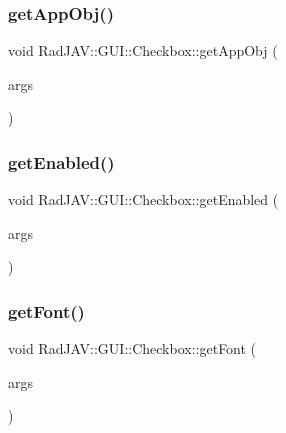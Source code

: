 \subsubsection{\texorpdfstring{get\+App\+Obj()}{getAppObj()}}
{\footnotesize\ttfamily void Rad\+J\+A\+V\+::\+G\+U\+I\+::\+Checkbox\+::get\+App\+Obj (\begin{DoxyParamCaption}\item[{const v8\+::\+Function\+Callback\+Info$<$ v8\+::\+Value $>$ \&}]{args }\end{DoxyParamCaption})\hspace{0.3cm}{\ttfamily [static]}}

\mbox{\label{class_rad_j_a_v_1_1_g_u_i_1_1_checkbox_a5dc6692db847ae14d49a7338acfaa6db}} 
\subsubsection{\texorpdfstring{get\+Enabled()}{getEnabled()}}
{\footnotesize\ttfamily void Rad\+J\+A\+V\+::\+G\+U\+I\+::\+Checkbox\+::get\+Enabled (\begin{DoxyParamCaption}\item[{const v8\+::\+Function\+Callback\+Info$<$ v8\+::\+Value $>$ \&}]{args }\end{DoxyParamCaption})\hspace{0.3cm}{\ttfamily [static]}}

\mbox{\label{class_rad_j_a_v_1_1_g_u_i_1_1_checkbox_ab4a781cb88f3ec2537f2eea0bead5cd9}} 
\subsubsection{\texorpdfstring{get\+Font()}{getFont()}}
{\footnotesize\ttfamily void Rad\+J\+A\+V\+::\+G\+U\+I\+::\+Checkbox\+::get\+Font (\begin{DoxyParamCaption}\item[{const v8\+::\+Function\+Callback\+Info$<$ v8\+::\+Value $>$ \&}]{args }\end{DoxyParamCaption})\hspace{0.3cm}{\ttfamily [static]}}

